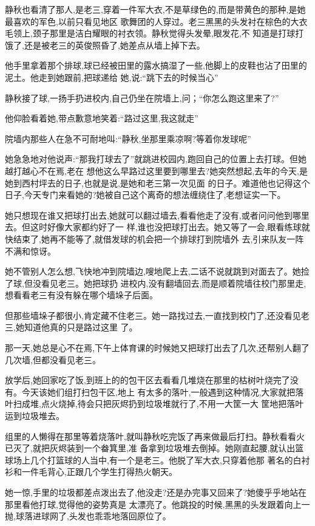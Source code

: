 ﻿\documentclass[12pt]{article}
\begin{document}
静秋也看清了那人,是老三,穿着一件军大衣,不是草绿色的,而是带黄色的那种,是她最喜欢的军色,以前只看见地区
歌舞团的人穿过。老三黑黑的头发衬在棕色的大衣毛领上,颈子那里是洁白耀眼的衬衣领。静秋觉得头发晕,眼发花,不
知道是打球打饿了,还是被老三的英俊照昏了,她差点从墙上掉下去。

他手里拿着那个排球,球已经被田里的露水搞湿了一些,他脚上的皮鞋也沾了田里的泥土。他走到她跟前,把球递给
她,说:``跳下去的时候当心\myrule ''

静秋接了球,一扬手扔进校内,自己仍坐在院墙上,问；``你\myrule 怎么跑这里来了?''

他仰脸看着她,带点歉意地笑着:``路过这里,我这就走\myrule ''

院墙内那些人在急不可耐地叫:``静秋,坐那里乘凉啊?等着你发球呢\myrule ''

她急急地对他说声:``那我打球去了\myrule ''就跳进校园内,跑回自己的位置上去打球。但她越打越心不在焉,老在
想他这么早路过这里要到哪里去?她突然想起,去年的今天,是她到西村坪去的日子,也就是说,是她和老三第一次见面
的日子。难道他也记得这个日子,今天专门来看她的?她被自己这个离奇的想法缠绕住了,老想证实一下。

她只想现在谁又把球打出去,她就可以翻过墙去,看看他走了没有,或者问问他到哪里去。但这时好像大家都约好了一
样,谁也没把球打出去。她又等了一会,眼看练球就快结束了,她再不能等了,就借发球的机会把一个排球打到院墙外
去,引来队友一阵不满和惊讶。

她不管别人怎么想,飞快地冲到院墙边,嗖地爬上去,二话不说就跳到对面去了。她捡了球,但没看见老三。她把球扔
进校内,没有翻墙回去,而是顺着院墙往校门那里走,想看看老三有没有躲在哪个墙垛子后面。

但那些墙垛子都很小,肯定藏不住老三。她一路找过去,一直找到校门了,还没看见老三,她知道他真的只是路过这里
了。

那一天,她总是心不在焉,下午上体育课的时候她又把球打出去了几次,还帮别人翻了几次墙,但都没看见老三。

放学后,她回家吃了饭,到班上的的包干区去看看几堆烧在那里的枯树叶烧完了没有。今天该她们组打扫包干区,地上
有太多的落叶,一般遇到这种情况,大家就把落叶扫成堆,点火烧掉,待会只把灰烬扔到垃圾堆就行了,不用一大筐一大
筐地把落叶运到垃圾堆去。

组里的人懒得在那里等着烧落叶,就叫静秋吃完饭了再来做最后打扫。静秋看看火已灭了,就把灰烬装到一个畚箕里,准
备拿到垃圾堆去倒掉。她刚直起腰,就认出篮球场上几个打篮球的人当中,有一个是老三。他脱了军大衣,只穿着他那
著名的白衬衫和一件毛背心,正跟几个学生打得热火朝天。

她一惊,手里的垃圾都差点泼出去了,他没走?还是办完事又回来了?她傻乎乎地站在那里看他打球,觉得他的姿势真是
太漂亮了。他跳投的时候,黑黑的头发跟着向上一抛,球落进球网了,头发也乖乖地落回原位了。
\end{document}
